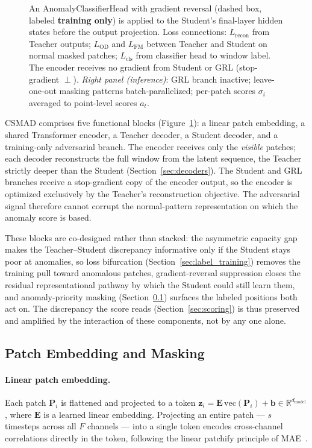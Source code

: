\begin{figure}[tbp]
{    An AnomalyClassifierHead with gradient reversal (dashed box, labeled \textbf{training only})
    is applied to the Student's final-layer hidden states before the output projection.
    Loss connections: $L_{\mathrm{recon}}$ from Teacher outputs; $L_{\mathrm{OD}}$ and
    $L_{\mathrm{FM}}$ between Teacher and Student on normal masked patches; $L_{\mathrm{cls}}$
    from classifier head to window label.
    The encoder receives no gradient from Student or GRL (stop-gradient $\perp$).
    \textit{Right panel (inference)}: GRL branch inactive; leave-one-out masking patterns
    batch-parallelized; per-patch scores $\sigma_i$ averaged to point-level scores $a_t$.}
  \label{fig:architecture}
\end{figure}

CSMAD comprises five functional blocks (Figure~\ref{fig:architecture}): a linear patch
embedding, a shared Transformer encoder, a Teacher decoder, a Student decoder, and a
training-only adversarial branch.
The encoder receives only the \emph{visible} patches; each decoder reconstructs the full window
from the latent sequence, the Teacher strictly deeper than the Student
(Section~\ref{sec:decoders}).
The Student and GRL branches receive a stop-gradient copy of the encoder output, so the encoder
is optimized exclusively by the Teacher's reconstruction objective.
The adversarial signal therefore cannot corrupt the normal-pattern representation on which the
anomaly score is based.

These blocks are co-designed rather than stacked: the asymmetric capacity gap makes the
Teacher--Student discrepancy informative only if the Student stays poor at anomalies, so loss
bifurcation (Section~\ref{sec:label_training}) removes the training pull toward anomalous patches,
gradient-reversal suppression closes the residual representational pathway by which the Student
could still learn them, and anomaly-priority masking (Section~\ref{sec:masking}) surfaces the
labeled positions both act on.
The discrepancy the score reads (Section~\ref{sec:scoring}) is thus preserved and amplified by the
interaction of these components, not by any one alone.

\subsection{Patch Embedding and Masking}
\label{sec:masking}

\paragraph{Linear patch embedding.}
Each patch $\mathbf{P}_i$ is flattened and projected to a token
$\mathbf{z}_i = \mathbf{E}\,\mathrm{vec}(\mathbf{P}_i) + \mathbf{b} \in \mathbb{R}^{d_{\mathrm{model}}}$,
where $\mathbf{E}$ is a learned linear embedding.
Projecting an entire patch --- $s$ timesteps across all $F$ channels --- into a single token
encodes cross-channel correlations directly in the token, following the linear patchify
principle of MAE~\cite{he2022mae}.

